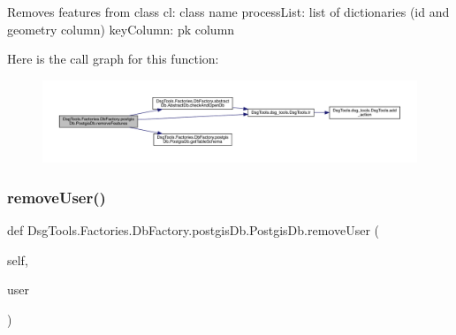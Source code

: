 \begin{DoxyVerb}Removes features from class
cl: class name
processList: list of dictionaries (id and geometry column)
keyColumn: pk column
\end{DoxyVerb}
 Here is the call graph for this function\+:
\nopagebreak
\begin{figure}[H]
\begin{center}
\leavevmode
\includegraphics[width=350pt]{class_dsg_tools_1_1_factories_1_1_db_factory_1_1postgis_db_1_1_postgis_db_a5f3497322b0b3db4c7a2aa925ba07f3a_cgraph}
\end{center}
\end{figure}
\mbox{\label{class_dsg_tools_1_1_factories_1_1_db_factory_1_1postgis_db_1_1_postgis_db_ae6f0406fe4595cd02ea974e1f6758ddf}} 
\subsubsection{\texorpdfstring{remove\+User()}{removeUser()}}
{\footnotesize\ttfamily def Dsg\+Tools.\+Factories.\+Db\+Factory.\+postgis\+Db.\+Postgis\+Db.\+remove\+User (\begin{DoxyParamCaption}\item[{}]{self,  }\item[{}]{user }\end{DoxyParamCaption})}

